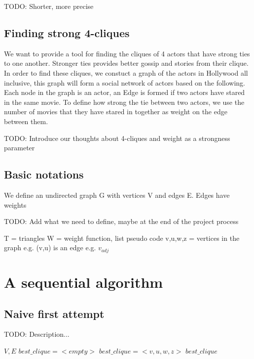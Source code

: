 \documentclass{article}
\begin{document}
TODO: Shorter, more precise


\subsection{Finding strong 4-cliques}
\noindent We want to provide a tool for finding the cliques of 4 actors that have strong ties to one another. Stronger ties provides better gossip and stories from their clique. In order to find these cliques, we constuct a graph of the actors in Hollywood all inclusive, this graph will form a social network of actors based on the following.
Each node in the graph is an actor, an Edge is formed if two actors have stared in the same movie. To define how strong the tie between two actors, we use the number of movies that they have stared in together as weight on the edge between them.

TODO: Introduce our thoughts about 4-cliques and weight as a strongness parameter

\subsection{Basic notations}
We define an undirected graph G with vertices V and edges E.
Edges have weights

TODO: Add what we need to define, maybe at the end of the project process

T = triangles
W = weight function, list pseudo code
v,u,w,z = vertices in the graph
e.g. (v,u) is an edge
e.g. $v_{adj}$


\section{A sequential algorithm}

\subsection{Naive first attempt}
TODO: Description...

\begin{algorithm}
\caption{$4clique\_iterator$}
\begin{algorithmic}
\REQUIRE $V,E$
\STATE $best\_clique = <empty>$
\STATE $best\_clique = <v,u,w,z>$
\ENDIF
\ENDIF
\ENDFOR
\ENDIF
\ENDFOR
\ENDFOR
\ENDFOR
\RETURN $best\_clique$
\end{algorithmic}
\end{algorithm}
\end{document}
